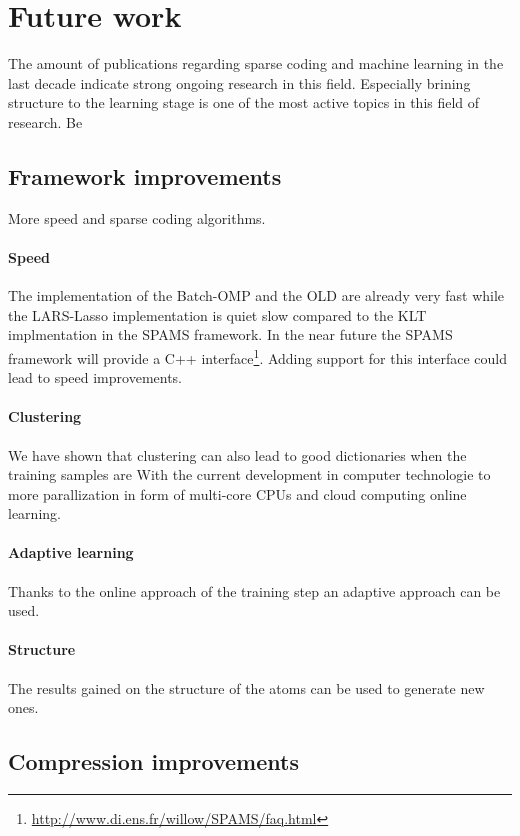 \section{Future work}
The amount of publications regarding sparse coding and machine learning in the
last decade indicate strong ongoing research in this field. Especially
brining structure to the learning stage is one of the most active topics in this
field of research. Be



\subsection{Framework improvements}
More speed and sparse coding algorithms.
\paragraph{Speed}
The implementation of the Batch-OMP and the OLD are already very fast while the
LARS-Lasso implementation is quiet slow compared to the KLT implmentation in the
SPAMS framework. In the near future the SPAMS framework will provide a C++
interface\footnote{\url{http://www.di.ens.fr/willow/SPAMS/faq.html}}. Adding
support for this interface could lead to speed improvements.

\paragraph{Clustering}
We have shown that clustering can also lead to good dictionaries when the
training samples are 
With the current development in computer technologie to more
parallization in form of multi-core CPUs and cloud computing online learning. 

\paragraph{Adaptive learning}
Thanks to the online approach of the training step an adaptive approach can be
used. 

\paragraph{Structure}
The results gained on the structure of the atoms can be used to generate new
ones.


\subsection{Compression improvements}

